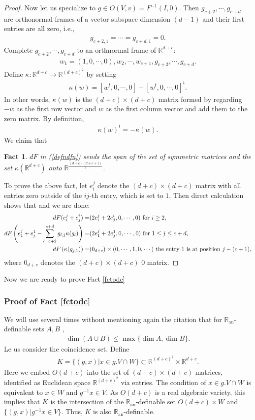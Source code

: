 \documentclass[11pt,a4paper]{amsart}
\numberwithin{equation}{section}
\newcommand{\s}{\subset}
\newcommand{\ran}{\mathbb{R}_{\operatorname{an}}}
\newcommand{\ka}{\kappa}
\newcommand{\m}{^{-1}}
\newcommand{\R}{\mathbb{R}}
\theoremstyle{plain}
\newtheorem{fact}{Fact}[subsection]
\theoremstyle{definition}
\numberwithin{equation}{subsection}
\begin{document}
\begin{proof}
Now let us specialize to $g\in O(V,v)=F\m(I,0)$.	Then $g_{c+2},\cdots,g_{c+d}$ are orthonormal frames of a vector subspace dimension $(d-1)$ and their first entries are all zero, i.e.,
\begin{align*}
	g_{c+2,1}=\cdots=g_{c+d,1}=0.
\end{align*}
Complete $g_{c+2},\cdots,g_{c+d}$ to an orthnormal frame of $\R^{d+c}:$
\begin{align*}
	w_1=(1,0,\cdots,0),w_2,\cdots,w_{c+1},g_{c+2},\cdots,g_{c+d}.
\end{align*}
Define $\kappa:\R^{d+c}\to\R^{(d+c)^2}$ by setting
\begin{align*}
	\kappa(w)=[w^t,0,\cdots,0]-[w^t,0,\cdots,0]^t.
\end{align*}
In other words, $\kappa(w)$ is the $(d+c)\times (d+c)$ matrix formed by regarding $-w$ as the first row vector and $w$ as the first column vector and add them to the zero matrix. By definition, 
\begin{align*}
	\kappa(w)^t=-\kappa(w).
\end{align*}We claim that 
\begin{fact}
$dF$ in (\ref{defndfn}) sends the span of the set of symmetric matrices and the set $\ka(\R^{d+c})$ onto $\R^{\frac{(d+c)(d+c+1)}{2}}$.
\end{fact}
To prove the above fact, let $e_i^j$ denote the $(d+c)\times(d+c)$ matrix with all entries zero outside of the $ij$-th entry, which is set to $1$. Then direct calculation shows that and we are done:
\begin{align*}
	dF(e_i^j+e_j^i)=&(2e_i^j+2e_j^i,0,\cdots,0)\textnormal{ for }i\ge 2,\\
	dF\left(e_1^j+e_j^1-\sum_{l=c+2}^{c+d}g_{l,j}\ka(g_l)\right)=&(2e_1^j+2e_j^1,0,\cdots,0)\textnormal{ for }1\le j\le c+d,\\
	dF\left(\ka(g_{j,1})\right)=&(0_{d+c})\times (0,\cdots,1,0,\cdots)\textnormal{ the entry }1\textnormal{ is at position }j-(c+1),
\end{align*}
where $0_{d+c}$ denotes the $(d+c)\times(d+c)$ $0$ matrix.
\end{proof}
Now we are ready to prove Fact \ref{fctodc}
\subsubsection{Proof of Fact \ref{fctodc}}We will use several times without mentioning again the citation that for $\ran$-definable sets $A,B$ \cite[Proposition 3.17 (3)]{MComin}, 
\begin{align}\label{eqdimu}
	\dim (A\cup B)\le \max\{\dim A,\dim B\}.
\end{align}
Le us consider the coincidence set. Define
\begin{align*}
	K=\{(g,x)|x\in g.V\cap W\}\s \R^{(d+c)^2}\times \R^{d+c}.
\end{align*}
Here we embed $O(d+c)$ into the set of $(d+c)\times (d+c) $ matrices, identified as Euclidean space $\R^{(d+c)^2}$ via entries. The condition of $x\in g.V\cap W$ is equivalent to $x\in W$ and $g\m x\in V.$ As $O(d+c)$ is a real algebraic variety, this implies that $K$ is the intersection of the $\ran$-definable set $O(d+c)\times W$ and $\{(g,x)|g\m x\in V\}.$ Thus, $K$ is also $\ran$-definable.
\end{document}
